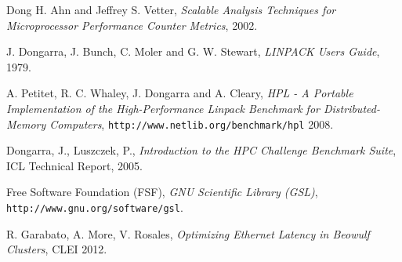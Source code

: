 \documentclass[a4paper]{report}
\begin{document}
\begin{thebibliography}{9}
  Dong H. Ahn and Jeffrey S. Vetter,
  \emph{Scalable Analysis Techniques for Microprocessor Performance Counter
    Metrics},
  2002.
  
  J. Dongarra, J. Bunch, C. Moler and G. W. Stewart, 
  \emph{LINPACK Users Guide},
  1979.
  
  A. Petitet, R. C. Whaley, J. Dongarra and A. Cleary, 
  \emph{HPL - A Portable Implementation of the High-Performance Linpack
    Benchmark for Distributed-Memory Computers}, {\tt http://www.netlib.org/benchmark/hpl}
  2008.

  Dongarra, J., Luszczek, P.,
  \emph{Introduction to the HPC Challenge Benchmark Suite}, ICL Technical Report,
  2005.  
  
  Free Software Foundation (FSF), \emph{GNU Scientific Library (GSL)},
  {\tt http://www.gnu.org/software/gsl}.

	R. Garabato, A. More, V. Rosales,
	\emph{Optimizing Ethernet Latency in Beowulf Clusters},
	CLEI 2012.

\end{thebibliography}
\end{document}
